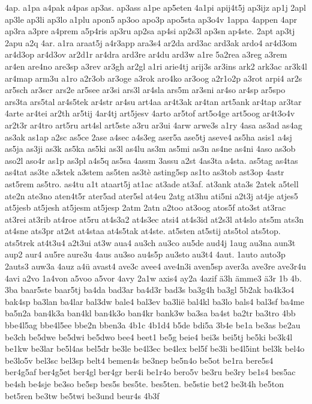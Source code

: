 {4ap.
a1pa
a4pak
a4pas
ap3as.
ap3ass
a1pe
ap5eten
4a1pi
apij4t5j
ap3ijz
ap1j
2apl
ap3le
ap3li
ap3lo
a1plu
apon5
ap3oo
apo3p
apo5sta
ap3o4v
1appa
4appen
4apr
ap3ra
a3pre
a4prem
a5p4ris
ap3ru
ap2sa
ap4si
ap2s3l
ap3sn
ap4ste.
2apt
ap3tj
2apu
a2q
4ar.
a1ra
araat5j
a4r3app
ara3s4
ar2da
ard3ac
ard3ak
ardo4
ar4d3om
ar4d3op
ar4d3ov
ar2d1r
ar4dra
ard3re
ar4du
ard3w
a1re
5a2rea
a3reg
a3rem
ar4en
are4no
are3sp
a3rev
ar3gh
ar2gl
a1ri
arie4tj
arij3s
ar3ins
ark2
ark3ac
ar3k4l
ar4map
arm3u
a1ro
a2r3ob
ar3oge
a3rok
aro4ko
ar3oog
a2r1o2p
a3rot
arpi4
ar2s
ar5sch
ar3scr
ars2e
ar5see
ar3si
ars3l
ar4sla
ars5m
ar3sni
ar4so
ar4sp
ar5spo
ars3ta
ars5tal
ar4s5tek
ar4str
ar4su
art4aa
ar4t3ak
ar4tan
art5ank
ar4tap
ar3tar
4arte
ar4tei
ar2th
ar5tij
4ar4tj
art5jesv
4arto
ar5tof
art5o4ge
art5oog
ar4t3o4v
ar2t3r
ar4tro
art5ru
art4sl
art5ste
a3ru
ar3ui
4arw
arwe3s
a1ry
4asa
as3ad
as4ag
as3ak
as1ap
a2sc
as5ce
2ase
a4sec
a4s3eg
aser5a
ase5tj
aseve4
as5ha
asis1
a4sj
as5ja
as3ji
as3k
as5ka
as5ki
as3l
as4lu
as3m
as5mi
as3n
as4ne
as4ni
4aso
as3ob
aso2l
aso4r
as1p
as3pl
a4s5q
as5sa
4assm
3assu
a2st
4as3ta
a4sta.
as5tag
as4tas
as4tat
as3te
a3stek
a3stem
as5ten
as3tè
asting5sp
as1to
as3tob
ast3op
4astr
ast5rem
as5tro.
as4tu
a1t
ataart5j
at1ac
at3ade
at3af.
at3ank
ata3s
2atek
a5tell
ate2n
ate3no
aten4t5r
ater5ad
ater5sl
at4eu
2atg
at3hu
ati5ni
a2t3j
at4je
atjes5
at5jesb
at5jesh
at5jesm
at5jesp
2atm
2atn
a2too
at3oog
atos5f
ato3st
at3rac
at3rei
at3rib
at4roe
at5ru
at4s3a2
at4s3ec
atsi4
at4s3id
at2s3l
at4slo
ats5m
ats3n
at4sne
ats3pr
at2st
at4staa
at4s5tak
at4ste.
at5sten
at5stij
ats5tol
ats5top.
ats5trek
at4t3u4
a2t3ui
at3w
aua4
au3ch
au3co
au5de
aud4j
1aug
au3na
aun3t
aup2
aur4
au5re
aure3u
4aus
au3so
au4s5p
au3sto
au3t4
4aut.
1auto
auto3p
2auts3
auw3a
4auz
a4ü
avast4
ave3c
avee4
ave4n3i
aven5sp
aver3a
ave3re
ave3r4u
4avi
a2vo
1a4von
a5voo
a5vor
4avy
2a1w
axis4
ay2a
4azif
ä3h
ämme3
ä3r
1b
4b.
3ba
baar5ste
baar5tj
ba4da
bad3ar
ba4d3r
bad3s
ba3g4h
ba3gl
5b2ak
ba4k3o4
bak4sp
ba3lan
ba4lar
bal3dw
bale4
bal3ev
ba3lië
bal4kl
ba3lo
bals4
bal3sf
ba4me
ba5n2a
ban4k3a
ban4kl
ban4k3o
ban4kr
bank3w
ba3sa
ba4st
ba2tr
ba3tro
4bb
bbe4l5ag
bbe4l5ee
bbe2n
bben3a
4b1c
4b1d4
b5de
bdi5a
3b4e
be1a
be3as
be2au
be3ch
be5dwe
be5dwi
be5dwo
bee4
beet1
be5g
beie4
bei3s
bei5tj
be5ki
be3k4l
be1kw
be3lar
be5l4as
bel5dr
be3le
be4l3ec
be4lex
bel5f
be3li
be4l5int
bel3k
bel4o
be3lo5v
bel3sc
bel3sp
belt4
bemen4s
be3nep
be5n4o
be5ot
be1ra
bere5s4
ber4g5af
ber4g5et
ber4gl
ber4gr
ber4i
be1r4o
bero5v
be3ru
be3ry
be1s4
bes5ac
be4sh
be4sje
be3so
be5sp
bes5s
bes5te.
bes5ten.
be5stie
bet2
be3t4h
be5ton
bet5ren
be3tw
be5twi
be3und
beur4s
4b3f
}
